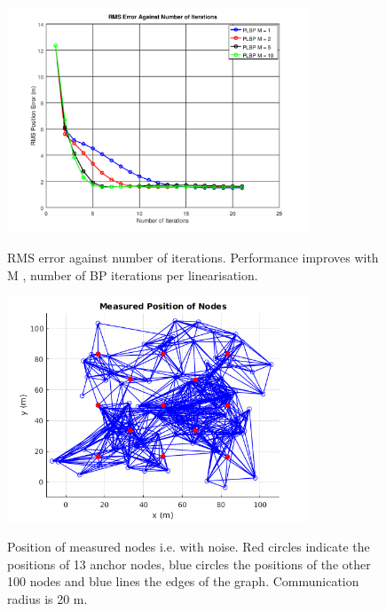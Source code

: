 \documentclass[12pt]{article}
\begin{document}
\begin{figure}
  \centering
{\includegraphics[width=0.8\textwidth]{images/RMSE.png}}
\caption{ RMS error against number of iterations. Performance improves with
M , number of BP iterations per linearisation. }
{\includegraphics[width=0.8\textwidth]{images/measured.png}}
\caption{ Position of measured nodes i.e. with noise. Red circles indicate the positions of 13
anchor nodes, blue circles the positions of the other 100 nodes and blue lines
the edges of the graph. Communication radius is 20 m.}

\end{figure}
\end{document}
